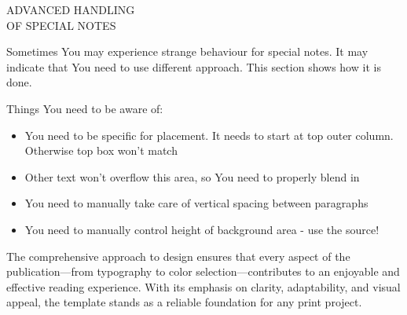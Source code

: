 \documentclass[10pt,a4paper,twoside,twocolumn,openany]{book}
\begin{document}
\begin{mdframed}[linewidth=0pt, innerleftmargin=10pt, innerrightmargin=10pt, backgroundcolor=none]
	
	{\color{white}%
		\centering %
		\Large
		\MakeUppercase{Advanced handling\\of Special Notes}
		\par}%
	\normalsize
	\raggedright
	
	\vspace{4pt}
	\setlength{\parskip}{1em}
	\begin{center}
		\parbox{\dimexpr\linewidth-20pt\relax}{%
			\setlength{\baselineskip}{1.2\baselineskip}%
			\color{white}
			Sometimes You may experience strange behaviour for special notes.
			It may indicate that You need to use different approach. This section 
			shows how it is done.
			
			\vspace{1em}
			Things You need to be aware of:
			\begin{itemize}
				\item You need to be specific for placement. It needs to start at
				top outer column. Otherwise top box won't match
				
				\item  Other text won't overflow this area, so You need to properly
				blend in
				
				\item You need to manually take care of vertical spacing between paragraphs
				
				\item You need to manually control height of background area - use the source!
			\end{itemize}
			
		}
	\end{center}
	
\end{mdframed}
  



The comprehensive approach to design ensures that every aspect of the publication—from typography to color selection—contributes to an enjoyable and effective reading experience. With its emphasis on clarity, adaptability, and visual appeal, the template stands as a reliable foundation for any print project.
\end{document}
